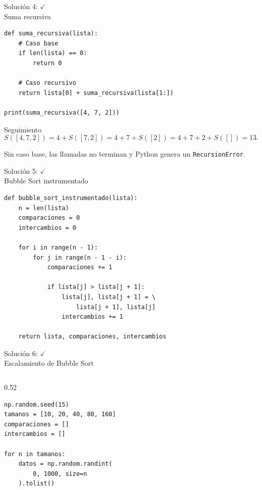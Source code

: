 \documentclass[10pt]{beamer}
\begin{document}
\begin{solutionblock}
\begin{frame}[fragile]{Solución 4: \hfill \textcolor{green}{$\checkmark$} \\ Suma recursiva}
\begin{verbatim}
def suma_recursiva(lista):
    # Caso base
    if len(lista) == 0:
        return 0

    # Caso recursivo
    return lista[0] + suma_recursiva(lista[1:])

print(suma_recursiva([4, 7, 2]))
\end{verbatim}

  \begin{block}{Seguimiento}
    \[
      S([4,7,2])=4+S([7,2])
      =4+7+S([2])
      =4+7+2+S([])
      =13.
    \]
  \end{block}

  Sin caso base, las llamadas no terminan y Python genera un \texttt{RecursionError}.
\end{frame}

\begin{frame}[fragile]{Solución 5: \hfill \textcolor{green}{$\checkmark$} \\ Bubble Sort instrumentado}
\begin{verbatim}
def bubble_sort_instrumentado(lista):
    n = len(lista)
    comparaciones = 0
    intercambios = 0

    for i in range(n - 1):
        for j in range(n - 1 - i):
            comparaciones += 1

            if lista[j] > lista[j + 1]:
                lista[j], lista[j + 1] = \
                    lista[j + 1], lista[j]
                intercambios += 1

    return lista, comparaciones, intercambios
\end{verbatim}
\end{frame}

\begin{frame}[fragile]{Solución 6: \hfill \textcolor{green}{$\checkmark$} \\ Escalamiento de Bubble Sort}
\begin{columns}
\begin{column}{0.52\textwidth}
\begin{verbatim}
np.random.seed(15)
tamanos = [10, 20, 40, 80, 160]
comparaciones = []
intercambios = []

for n in tamanos:
    datos = np.random.randint(
        0, 1000, size=n
    ).tolist()


\end{verbatim}
\end{column}
\end{columns}
\end{frame}
\end{solutionblock}
\end{document}
